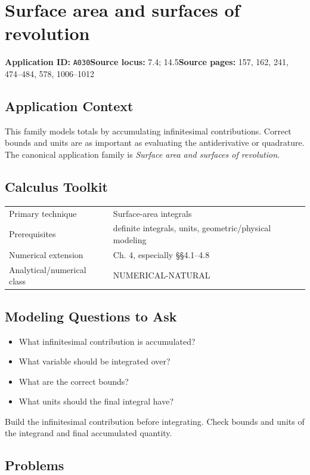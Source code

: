 \documentclass[11pt]{book}
\newcommand{\pid}[1]{\texttt{#1}}
\begin{document}
\chapter{Surface area and surfaces of revolution}\label{app:A030}
\textbf{Application ID:} \pid{A030}\quad \textbf{Source locus:} 7.4; 14.5\quad \textbf{Source pages:} 157, 162, 241, 474–484, 578, 1006–1012
\section*{Application Context}
This family models totals by accumulating infinitesimal contributions. Correct bounds and units are as important as evaluating the antiderivative or quadrature. The canonical application family is \emph{Surface area and surfaces of revolution}.
\section*{Calculus Toolkit}
\begin{tabularx}{\textwidth}{@{}lX@{}}\toprule
Primary technique & Surface-area integrals \\
Prerequisites & definite integrals, units, geometric/physical modeling \\
Numerical extension & Ch. 4, especially §§4.1–4.8 \\
Analytical/numerical class & NUMERICAL-NATURAL \\
\bottomrule\end{tabularx}
\section*{Modeling Questions to Ask}\begin{itemize}
\item What infinitesimal contribution is accumulated?
\item What variable should be integrated over?
\item What are the correct bounds?
\item What units should the final integral have?
\end{itemize}
\begin{errorbox}Build the infinitesimal contribution before integrating. Check bounds and units of the integrand and final accumulated quantity.\end{errorbox}
\section*{Problems}
\end{document}
